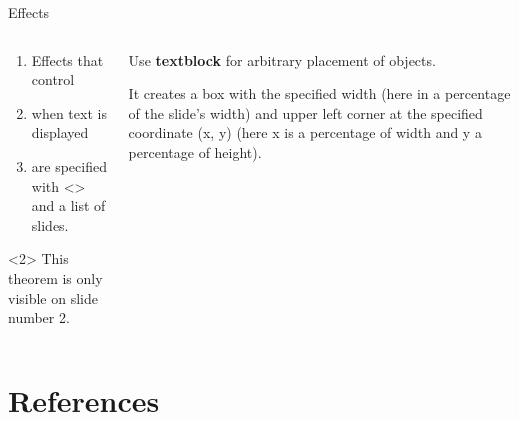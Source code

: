 \documentclass[aspectratio=169]{beamer}
\begin{document}
\begin{frame}{Effects}
    \begin{columns}[onlytextwidth]
        \begin{column}{0.49\textwidth}
            \begin{enumerate}[<+-|alert@+>]
                \item
                Effects that control

                \item
                when text is displayed

                \item
                are specified with <> and a list of slides.
            \end{enumerate}

            \begin{theorem}<2>
                This theorem is only visible on slide number 2.
            \end{theorem}
        \end{column}
        \begin{column}{0.49\textwidth}
            Use \textbf<2->{textblock} for arbitrary placement of objects.

            \pause
            \medskip

            It creates a box
            with the specified width (here in a percentage of the slide's width)
            and upper left corner at the specified coordinate (x, y)
            (here x is a percentage of width and y a percentage of height).
        \end{column}
    \end{columns}
    
\end{frame}


\section{References}
\end{document}
